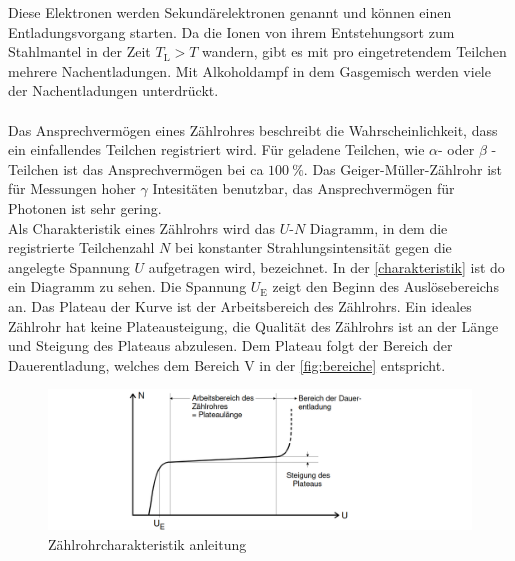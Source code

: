 Diese Elektronen werden Sekundärelektronen genannt und können einen Entladungsvorgang starten.
Da die Ionen von ihrem Entstehungsort zum Stahlmantel in der Zeit $T_{\text{L}}>T$ wandern, gibt es mit pro eingetretendem Teilchen mehrere Nachentladungen.
Mit Alkoholdampf in dem Gasgemisch werden viele der Nachentladungen unterdrückt.\\
\\
Das Ansprechvermögen eines Zählrohres beschreibt die Wahrscheinlichkeit, dass ein einfallendes Teilchen registriert wird.
Für geladene Teilchen, wie $\alpha$- oder $\beta $ -Teilchen ist das Ansprechvermögen bei ca $\SI{100}{\percent}$.
Das Geiger-Müller-Zählrohr ist für Messungen hoher $\gamma$ Intesitäten benutzbar, das Ansprechvermögen für Photonen ist sehr gering.\\
Als Charakteristik eines Zählrohrs wird das $U$-$N$ Diagramm, in dem die registrierte Teilchenzahl $N$ bei konstanter Strahlungsintensität gegen die angelegte Spannung $U$ aufgetragen wird, bezeichnet.
In der \autoref{charakteristik} ist do ein Diagramm zu sehen. 
Die Spannung $U_{\text{E}}$ zeigt den Beginn des Auslösebereichs an. 
Das Plateau der Kurve ist der Arbeitsbereich des Zählrohrs.
Ein ideales Zählrohr hat keine Plateausteigung, die Qualität des Zählrohrs ist an der Länge und Steigung des Plateaus abzulesen.
Dem Plateau folgt der Bereich der Dauerentladung, welches dem Bereich V in der \autoref{fig:bereiche} entspricht.
\begin{figure}
    \centering
    \includegraphics[width=\textwidth]{charakteristik.png}
    \caption{Zählrohrcharakteristik \cite{5}{anleitung}}
    \label{fig:charakteristik}
\end{figure}